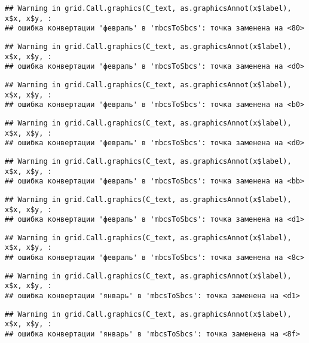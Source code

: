 \documentclass[
]{article}
\begin{document}
\begin{verbatim}
## Warning in grid.Call.graphics(C_text, as.graphicsAnnot(x$label), x$x, x$y, :
## ошибка конвертации 'февраль' в 'mbcsToSbcs': точка заменена на <80>
\end{verbatim}

\begin{verbatim}
## Warning in grid.Call.graphics(C_text, as.graphicsAnnot(x$label), x$x, x$y, :
## ошибка конвертации 'февраль' в 'mbcsToSbcs': точка заменена на <d0>
\end{verbatim}

\begin{verbatim}
## Warning in grid.Call.graphics(C_text, as.graphicsAnnot(x$label), x$x, x$y, :
## ошибка конвертации 'февраль' в 'mbcsToSbcs': точка заменена на <b0>
\end{verbatim}

\begin{verbatim}
## Warning in grid.Call.graphics(C_text, as.graphicsAnnot(x$label), x$x, x$y, :
## ошибка конвертации 'февраль' в 'mbcsToSbcs': точка заменена на <d0>
\end{verbatim}

\begin{verbatim}
## Warning in grid.Call.graphics(C_text, as.graphicsAnnot(x$label), x$x, x$y, :
## ошибка конвертации 'февраль' в 'mbcsToSbcs': точка заменена на <bb>
\end{verbatim}

\begin{verbatim}
## Warning in grid.Call.graphics(C_text, as.graphicsAnnot(x$label), x$x, x$y, :
## ошибка конвертации 'февраль' в 'mbcsToSbcs': точка заменена на <d1>
\end{verbatim}

\begin{verbatim}
## Warning in grid.Call.graphics(C_text, as.graphicsAnnot(x$label), x$x, x$y, :
## ошибка конвертации 'февраль' в 'mbcsToSbcs': точка заменена на <8c>
\end{verbatim}

\begin{verbatim}
## Warning in grid.Call.graphics(C_text, as.graphicsAnnot(x$label), x$x, x$y, :
## ошибка конвертации 'январь' в 'mbcsToSbcs': точка заменена на <d1>
\end{verbatim}

\begin{verbatim}
## Warning in grid.Call.graphics(C_text, as.graphicsAnnot(x$label), x$x, x$y, :
## ошибка конвертации 'январь' в 'mbcsToSbcs': точка заменена на <8f>
\end{verbatim}
\end{document}
